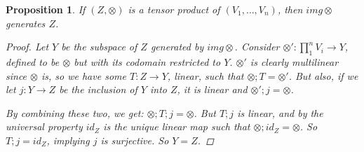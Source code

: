 \documentclass[a4paper,14pt]{article}
\newtheorem*{prop}{Proposition}
\begin{document}
\begin{prop}
If $(Z, \otimes)$ is a tensor product of $(V_1, \ldots, V_n)$, then $img \otimes$ generates $Z$.
\begin{proof}
Let $Y$ be the subspace of $Z$ generated by $img \otimes$. Consider $\otimes': \prod_1^n V_i \to Y$, defined to be $\otimes$ but with its codomain restricted to $Y$. $\otimes'$ is clearly multilinear since $\otimes$ is, so we have some $T: Z \to Y$, linear, such that $\otimes; T = \otimes'$. But also, if we let $j: Y \to Z$ be the inclusion of $Y$ into $Z$, it is linear and $\otimes'; j = \otimes$. 

\begin{center}
\end{center}

By combining these two, we get: $\otimes;T;j = \otimes$. But $T;j$ is linear, and by the universal property $id_Z$ is the unique linear map such that $\otimes; id_Z = \otimes$. So $T;j = id_Z$, implying $j$ is surjective. So $Y = Z$.

\end{proof}
\end{prop}
\end{document}
